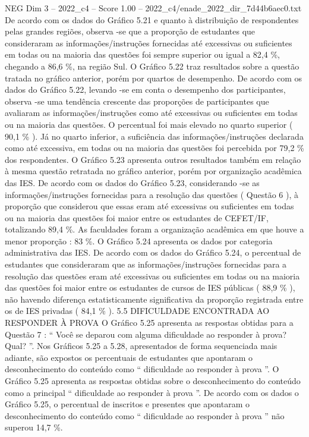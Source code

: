 \begin{textsample}{NEG Dim 3 – 2022\_c4 – Score 1.00 – 2022\_c4/enade\_2022\_dir\_7d44b6aec0.txt}
De acordo com os dados do Gráfico 5.21 e quanto à distribuição de respondentes pelas grandes regiões, observa -se que a proporção de estudantes que consideraram as informações/instruções fornecidas até excessivas ou suficientes em todas ou na maioria das questões foi sempre superior ou igual a 82,4 \%, chegando a 86,6 \%, na região Sul.
O Gráfico 5.22 traz resultados sobre a questão tratada no gráfico anterior, porém por quartos de desempenho.
De acordo com os dados do Gráfico 5.22, levando -se em conta o desempenho dos participantes, observa -se uma tendência crescente das proporções de participantes que avaliaram as informações/instruções como até excessivas ou suficientes em todas ou na maioria das questões.
O percentual foi mais elevado no quarto superior ( 90,1 \% ).
Já no quarto inferior, a suficiência das informações/instruções declarada como até excessiva, em todas ou na maioria das questões foi percebida por 79,2 \% dos respondentes.
O Gráfico 5.23 apresenta outros resultados também em relação à mesma questão retratada no gráfico anterior, porém por organização acadêmica das IES.
De acordo com os dados do Gráfico 5.23, considerando -se as informações/instruções fornecidas para a resolução das questões ( Questão 6 ), à proporção que considerou que essas eram até excessivas ou suficientes em todas ou na maioria das questões foi maior entre os estudantes de CEFET/IF, totalizando 89,4 \%.
As faculdades foram a organização acadêmica em que houve a menor proporção : 83 \%.
O Gráfico 5.24 apresenta os dados por categoria administrativa das IES.
De acordo com os dados do Gráfico 5.24, o percentual de estudantes que consideraram que as informações/instruções fornecidas para a resolução das questões eram até excessivas ou suficientes em todas ou na maioria das questões foi maior entre os estudantes de cursos de IES públicas ( 88,9 \% ), não havendo diferença estatisticamente significativa da proporção registrada entre os de IES privadas ( 84,1 \% ). 5.5 DIFICULDADE ENCONTRADA AO RESPONDER À PROVA O Gráfico 5.25 apresenta as respostas obtidas para a Questão 7 : “ Você se deparou com alguma dificuldade ao responder à prova?
Qual? ”.
Nos Gráficos 5.25 a 5.28, apresentados de forma sequenciada mais adiante, são expostos os percentuais de estudantes que apontaram o desconhecimento do conteúdo como “ dificuldade ao responder à prova ”.
O Gráfico 5.25 apresenta as respostas obtidas sobre o desconhecimento do conteúdo como a principal “ dificuldade ao responder à prova ”.
De acordo com os dados o Gráfico 5.25, o percentual de inscritos e presentes que apontaram o desconhecimento do conteúdo como “ dificuldade ao responder à prova ” não superou 14,7 \%.

\end{textsample}
